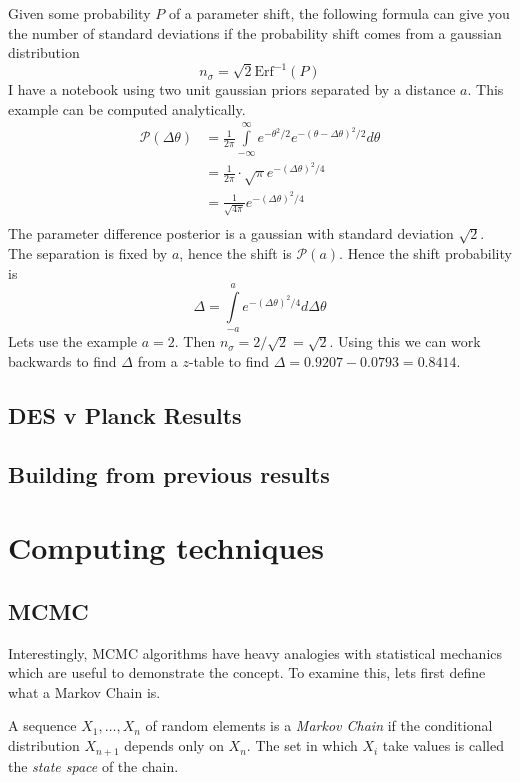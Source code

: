 Given some probability $P$ of a parameter shift, the following formula can give you the number of standard deviations if the probability shift comes from a gaussian distribution
\[ n_\sigma = \sqrt{2} \text{Erf}^{-1}(P) \]
I have a notebook using two unit gaussian priors separated by a distance $a$. This example can be computed analytically.
\begin{equation*}
    \begin{split}
	\mathcal{P}(\Delta \theta) &= \frac{1}{2\pi} \int\limits_{-\infty}^{\infty} e^{-\theta^2/2} e^{-{(\theta-\Delta\theta)}^2/2}  d\theta \\
				   &= \frac{1}{2\pi} \cdot \sqrt{\pi} e^{-{(\Delta\theta)}^2/4}\\
				   &= \frac{1}{\sqrt{4\pi}}e^{-{(\Delta\theta)}^2/4}\\
    \end{split}
\end{equation*}
The parameter difference posterior is a gaussian with standard deviation $\sqrt{2}$. The separation is fixed by $a$, hence the shift is $\mathcal{P}(a)$. Hence the shift probability is
\[ \Delta = \int\limits_{-a}^{a} e^{-{(\Delta\theta)}^2/4} d\Delta\theta \]
Lets use the example $a=2$. Then $n_\sigma = 2/\sqrt{2} = \sqrt{2}$. Using this we can work backwards to find $\Delta$ from a $z$-table to find $\Delta = 0.9207 - 0.0793 = 0.8414 $. 

\subsection{DES v Planck Results}
\subsection{Building from previous results}
\section{Computing techniques}
\subsection{MCMC}

Interestingly, MCMC algorithms have heavy analogies with statistical mechanics which are useful to demonstrate the concept. To examine this, lets first define what a Markov Chain is.
\begin{defn}
A sequence $X_1,\hdots,X_n$ of random elements is a \textit{Markov Chain} if the conditional distribution $X_{n+1}$ depends only on $X_n$. The set in which $X_i$ take values is called the \textit{state space} of the chain.
\end{defn}


